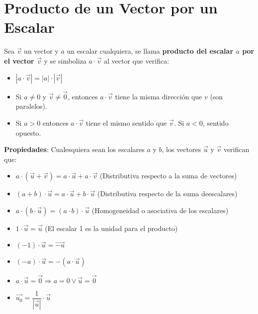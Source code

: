 \documentclass[11pt,a4paper]{article}
\begin{document}
\section{Producto de un Vector por un Escalar}
\noindent Sea $\overrightarrow{v}$ un vector y $a$ un escalar cualquiera, se llama \textbf{producto del escalar $a$ por el vector $\overrightarrow{v}$} y se simboliza $a\cdot \overrightarrow{v}$ al vector que verifica:
\begin{itemize}
\item $|a \cdot \overrightarrow{v}| = |a| \cdot |\overrightarrow{v}|$
\item Si $a\not=0$ y $\overrightarrow{v}\not=\overrightarrow{0}$, entonces $a\cdot\overrightarrow{v}$ tiene la misma direcci\'on que $v$ (son paralelos).
\item Si $a>0$ entonces $a\cdot\overrightarrow{v}$ tiene el mismo sentido que $\overrightarrow{v}$. Si $a<0$, sentido opuesto.
\end{itemize}
\noindent \textbf{Propiedades}: Cualesquiera sean los escalares $a$ y $b$, los vectores $\overrightarrow{u}$ y $\overrightarrow{v}$ verifican que:
\begin{itemize}
\item $a\cdot(\overrightarrow{u} + \overrightarrow{v}) = a\cdot\overrightarrow{u} + a\cdot\overrightarrow{v}$ (Distributiva respecto a la suma de vectores)
\item $(a+b)\cdot\overrightarrow{u} = a\cdot\overrightarrow{u} + b\cdot\overrightarrow{u}$ (Distributiva respecto de la suma deescalares)
\item $a\cdot(b\cdot\overrightarrow{u}) = (a\cdot b)\cdot\overrightarrow{u}$ (Homogeneidad o asociativa de los escalares)
\item $1\cdot\overrightarrow{u} = \overrightarrow{u}$ (El escalar 1 es la unidad para el producto)
\item $(-1)\cdot\overrightarrow{u} = \overrightarrow{-u}$
\item $(-a)\cdot\overrightarrow{u} = -(a\cdot\overrightarrow{u})$
\item $a\cdot\overrightarrow{u} = \overrightarrow{0} \Rightarrow a=0 \lor \overrightarrow{u}=\overrightarrow{0}$
\item $\overrightarrow{u_0} = \dfrac{1}{|\overrightarrow{u}|}\cdot\overrightarrow{u}$
\end{itemize}
\end{document}
